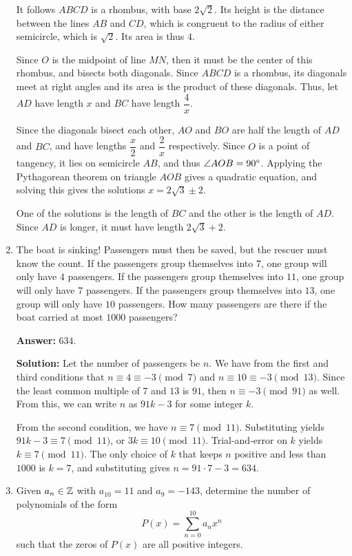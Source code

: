 \documentclass[11pt,paper=letter]{scrartcl}
\begin{document}
\begin{enumerate}[left=0pt]
It follows $ABCD$ is a rhombus, with base $2\sqrt2$. Its height is the distance between the lines $AB$ and $CD$, which is congruent to the radius of either semicircle, which is $\sqrt2$. Its area is thus $4$.

Since $O$ is the midpoint of line $MN$, then it must be the center of this rhombus, and bisects both diagonals. Since $ABCD$ is a rhombus, its diagonals meet at right angles and its area is the product of these diagonals. Thus, let $AD$ have length $x$ and $BC$ have length $\dfrac4x$.

Since the diagonals bisect each other, $AO$ and $BO$ are half the length of $AD$ and $BC$, and have lengths $\dfrac x2$ and $\dfrac 2x$ respectively. Since $O$ is a point of tangency, it lies on semicircle $AB$, and thus $\angle AOB = 90^\circ$. Applying the Pythagorean theorem on triangle $AOB$ gives a quadratic equation, and solving this gives the solutions $x = 2\sqrt3\pm2$.

One of the solutions is the length of $BC$ and the other is the length of $AD$. Since $AD$ is longer, it must have length $2\sqrt3 + 2$.

\item The boat is sinking! Passengers must then be saved, but the rescuer must know the count. If the passengers group themselves into $7$, one group will only have $4$ passengers. If the passengers group themselves into $11$, one group will only have $7$ passengers. If the passengers group themselves into $13$, one group will only have $10$ passengers. How many passengers are there if the boat carried at most $1000$ passengers?

\textbf{Answer:} $\boxed{634}$.

\textbf{Solution:} Let the number of passengers be $n$. We have from the first and third conditions that $n \equiv 4 \equiv -3 \pmod 7$ and $n \equiv 10 \equiv -3 \pmod{13}$. Since the least common multiple of $7$ and $13$ is $91$, then $n \equiv -3 \pmod{91}$ as well. From this, we can write $n$ as $91k - 3$ for some integer $k$.

From the second condition, we have $n \equiv 7 \pmod{11}$. Substituting yields $91k - 3 \equiv 7 \pmod{11}$, or $3k \equiv 10 \pmod{11}$. Trial-and-error on $k$ yields $k \equiv 7 \pmod {11}$. The only choice of $k$ that keeps $n$ positive and less than $1000$ is $k = 7$, and substituting gives $n = 91\cdot7 - 3 = 634$.

\item Given $a_n \in \mathbb Z$ with $a_{10} = 11$ and $a_9 = -143$, determine the number of polynomials of the form $$P(x) = \sum_{n=0}^{10}a_nx^n$$ such that the zeros of $P(x)$ are all positive integers.


\end{enumerate}
\end{document}
